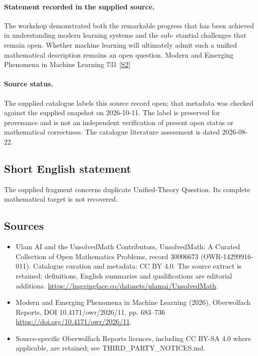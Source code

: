 \documentclass[11pt]{article}
\newcommand{\sref}[2]{\hyperlink{source:#1:#2}{[S#2]}}
\begin{document}
\paragraph{Statement recorded in the supplied source.}
The workshop demonstrated both the remarkable progress that has been achieved in understanding modern learning systems and the sub- stantial challenges that remain open. Whether machine learning will ultimately admit such a uniﬁed mathematical description remains an open question. Modern and Emerging Phenomena in Machine Learning 731 \sref{30006673}{2}
\paragraph{Source status.}
The supplied catalogue labels this source record open; that metadata was checked against the supplied snapshot on 2026-10-11. The label is preserved for provenance and is not an independent verification of present open status or mathematical correctness. The catalogue literature assessment is dated 2026-08-22.
\subsection{Short English statement}
The supplied fragment concerns duplicate Unified-Theory Question. Its complete mathematical target is not recovered.
\subsection{Sources}
\begin{itemize}
\item[\hypertarget{source:30006673:1}{S1}] Ulam AI and the UnsolvedMath Contributors, UnsolvedMath: A Curated Collection of Open Mathematics Problems, record 30006673 (OWR-14299916-011). Catalogue curation and metadata: CC BY 4.0. The source extract is retained; definitions, English summaries and qualifications are editorial additions.
\url{https://huggingface.co/datasets/ulamai/UnsolvedMath}.
\item[\hypertarget{source:30006673:2}{S2}] Modern and Emerging Phenomena in Machine Learning (2026), Oberwolfach Reports, DOI 10.4171/owr/2026/11, pp. 683--736
\url{https://doi.org/10.4171/owr/2026/11}.
\item Source-specific Oberwolfach Reports licences, including CC BY-SA 4.0 where applicable, are retained; see THIRD\_PARTY\_NOTICES.md.
\end{itemize}
\end{document}
